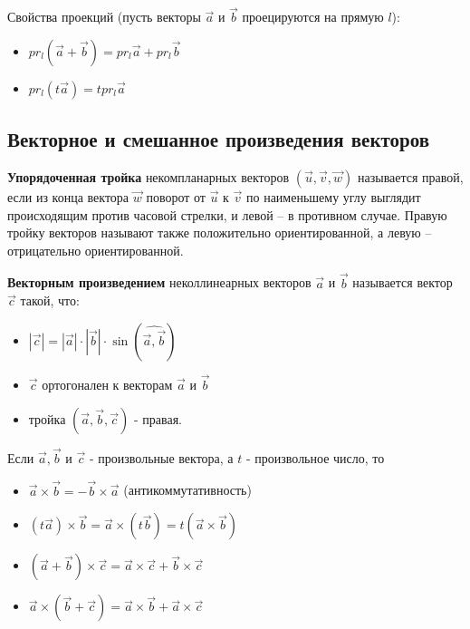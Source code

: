 \documentclass[a4paper]{article}
\begin{document}
    Свойства проекций (пусть векторы $\vec{a}$ и $\vec{b}$ проецируются на прямую $l$):
    \begin{itemize}
        \item $pr_l (\vec{a} + \vec{b}) = pr_l \vec{a} + pr_l \vec{b}$
        \item $pr_l (t \vec{a}) = t pr_l \vec{a}$
    \end{itemize}


    \newpage \begin{center}
                 \begin{Large}
                 \end{Large}
    \end{center}
    \subsection*{Векторное и смешанное произведения векторов}

    \textbf{Упорядоченная тройка} некомпланарных векторов $(\vec{u}, \vec{v}, \vec{w})$  называется
    правой, если из конца вектора $\vec{w}$ поворот от $\vec{u}$ к $\vec{v}$ по наименьшему углу
    выглядит происходящим против часовой стрелки, и левой – в противном случае. Правую тройку векторов называют также положительно
    ориентированной, а левую – отрицательно ориентированной.

    \textbf{Векторным произведением} неколлинеарных векторов $\vec{a}$ и $\vec{b}$ называется
    вектор $\vec{c}$ такой, что:
    \begin{itemize}
        \item $| \vec{c}| = | \vec{a} | \cdot | \vec{b} | \cdot \sin (\widehat{\vec{a}, \vec{b}})$
        \item $\vec{c}$ ортогонален к векторам $\vec{a}$ и $\vec{b}$
        \item тройка $(\vec{a}, \vec{b}, \vec{c})$ - правая.
    \end{itemize}

    Если $\vec{a}, \vec{b}$ и $\vec{c}$ - произвольные вектора, а $t$ - произвольное число, то
    \begin{itemize}
        \item $\vec{a} \times \vec{b} = -\vec{b} \times \vec{a}$ (антикоммутативность)
        \item $(t \vec{a}) \times \vec{b} = \vec{a} \times (t \vec{b}) = t ( \vec{a} \times \vec{b})$
        \item $(\vec{a} +\vec{b}) \times \vec{c} = \vec{a} \times \vec{c} + \vec{b} \times \vec{c}$
        \item $\vec{a} \times (\vec{b} + \vec{c}) = \vec{a} \times \vec{b} +\vec{a} \times \vec{c}$
    \end{itemize}
\end{document}
